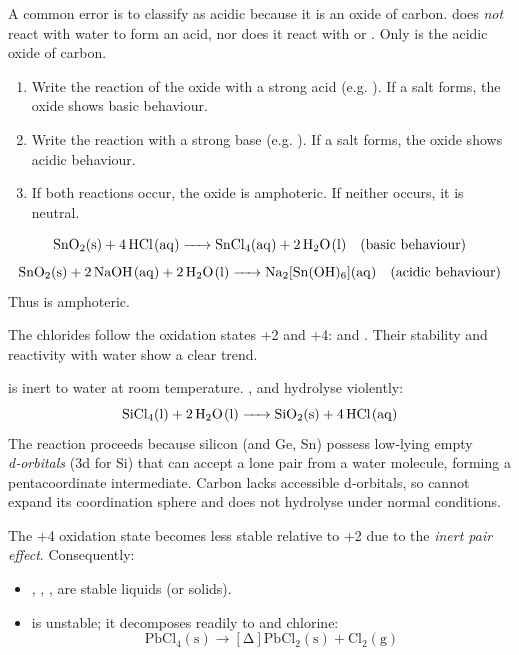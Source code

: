 \documentclass[11pt]{article}
\newcounter{popsec}
\newcounter{popsub}
\newcommand{\courssub}[1]{%
  \stepcounter{popsub}%
  \par\vspace{9pt}\noindent{\popxbold\fontsize{11.5}{13}\selectfont\color{popink}{\color{poporange}\thepopsec.\thepopsub}\hspace{6pt}#1}\par\nopagebreak\vspace{4pt}
}
\begin{document}
\begin{attention}
A common error is to classify  as acidic because it is an oxide of carbon.  does \emph{not} react with water to form an acid, nor does it react with  or . Only  is the acidic oxide of carbon.
\end{attention}

\begin{methode}
\begin{enumerate}
\item Write the reaction of the oxide with a strong acid (e.g. ). If a salt forms, the oxide shows basic behaviour.
\item Write the reaction with a strong base (e.g. ). If a salt forms, the oxide shows acidic behaviour.
\item If both reactions occur, the oxide is amphoteric. If neither occurs, it is neutral.
\end{enumerate}
\end{methode}

\begin{exemplebox}
\[
\ce{SnO2(s) + 4HCl(aq) -> SnCl4(aq) + 2H2O(l)} \quad\text{(basic behaviour)}
\]
\[
\ce{SnO2(s) + 2NaOH(aq) + 2H2O(l) -> Na2[Sn(OH)6](aq)} \quad\text{(acidic behaviour)}
\]
Thus  is amphoteric.
\end{exemplebox}

\courssub{Chlorides of Group IV}

The chlorides follow the oxidation states +2 and +4:  and . Their stability and reactivity with water show a clear trend.

\begin{propriete}
 is inert to water at room temperature. ,  and  hydrolyse violently:
\[
\ce{SiCl4(l) + 2H2O(l) -> SiO2(s) + 4HCl(aq)}
\]
The reaction proceeds because silicon (and Ge, Sn) possess low‑lying empty \emph{d‑orbitals} (3d for Si) that can accept a lone pair from a water molecule, forming a pentacoordinate intermediate. Carbon lacks accessible d‑orbitals, so  cannot expand its coordination sphere and does not hydrolyse under normal conditions.
\end{propriete}

\begin{propriete}
The +4 oxidation state becomes less stable relative to +2 due to the \emph{inert pair effect}. Consequently:
\begin{itemize}
\item {}, , ,  are stable liquids (or solids).
\item {} is unstable; it decomposes readily to  and chlorine:
\[
\ensuremath{\mathrm{PbCl_{4}(s) \rightarrow [\Delta] PbCl_{2}(s) + Cl_{2}(g)}}
\]
\end{itemize}
\end{propriete}
\end{document}
